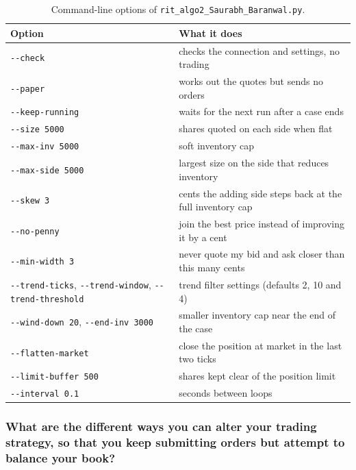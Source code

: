 \documentclass{article}
\begin{document}
\begin{table}[H]
\centering
\begin{tabular}{ll}
\toprule
Option & What it does \\
\midrule
\texttt{-{}-check} & checks the connection and settings, no trading \\
\texttt{-{}-paper} & works out the quotes but sends no orders \\
\texttt{-{}-keep-running} & waits for the next run after a case ends \\
\texttt{-{}-size 5000} & shares quoted on each side when flat \\
\texttt{-{}-max-inv 5000} & soft inventory cap \\
\texttt{-{}-max-side 5000} & largest size on the side that reduces inventory \\
\texttt{-{}-skew 3} & cents the adding side steps back at the full inventory cap \\
\texttt{-{}-no-penny} & join the best price instead of improving it by a cent \\
\texttt{-{}-min-width 3} & never quote my bid and ask closer than this many cents \\
\texttt{-{}-trend-ticks}, \texttt{-{}-trend-window}, \texttt{-{}-trend-threshold} & trend filter settings (defaults 2, 10 and 4) \\
\texttt{-{}-wind-down 20}, \texttt{-{}-end-inv 3000} & smaller inventory cap near the end of the case \\
\texttt{-{}-flatten-market} & close the position at market in the last two ticks \\
\texttt{-{}-limit-buffer 500} & shares kept clear of the position limit \\
\texttt{-{}-interval 0.1} & seconds between loops \\
\bottomrule
\end{tabular}
\caption{Command-line options of \texttt{rit\_algo2\_Saurabh\_Baranwal.py}.}
\label{tab:sb_algo2_options}
\end{table}

\subsubsection{What are the different ways you can alter your trading strategy, so that you keep submitting orders but attempt to balance your book?}
\end{document}

